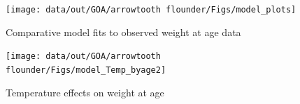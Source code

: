 \documentclass[
]{article}
\begin{document}
\begin{figure}

{\centering \texttt{[image: data/out/GOA/arrowtooth flounder/Figs/model\_plots]} 

}

\caption{Comparative model fits to observed weight at age data}\label{fig:unnamed-chunk-26}
\end{figure}

\begin{figure}

{\centering \texttt{[image: data/out/GOA/arrowtooth flounder/Figs/model\_Temp\_byage2]} 

}

\caption{Temperature effects on weight at age}\label{fig:unnamed-chunk-27}
\end{figure}
\end{document}
